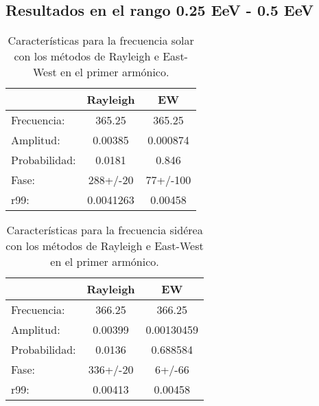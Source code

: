\subsection*{Resultados en el rango 0.25 EeV - 0.5 EeV}
\begin{table}[H]
    \begin{small}
        \begin{center}
            \begin{tabular}[c]{l|c|c}
                                & Rayleigh      & EW            \\\hline
                Frecuencia:     & 365.25	    & 365.25         \\
                Amplitud:       & 0.00385       & 0.000874    \\
                Probabilidad:   & 0.0181        & 0.846     \\
                Fase:           & 288+/-20      & 77+/-100           \\
                r99:            & 0.0041263     & 0.00458  \\
            \end{tabular}
        \end{center}
    \end{small}
    \caption{Características para la frecuencia solar con los métodos de Rayleigh  e East-West en el primer armónico.}
    \label{tab:solar}
\end{table}

\begin{table}[H]
    \begin{small}
        \begin{center}
            \begin{tabular}[c]{l|c|c}
                                & Rayleigh     & EW         \\\hline
                Frecuencia:     & 366.25	   & 366.25        \\
                Amplitud:       & 0.00399	   & 0.00130459     \\
                Probabilidad:   & 0.0136	   & 0.688584     \\
                Fase:           & 336+/-20	   & 6+/-66          \\
                r99:            & 0.00413	   & 0.00458    \\
            \end{tabular}
        \end{center}
    \end{small}
    \caption{Características para la frecuencia sidérea con los métodos de Rayleigh  e East-West en el primer armónico.}
    \label{tab:solar}
\end{table}

